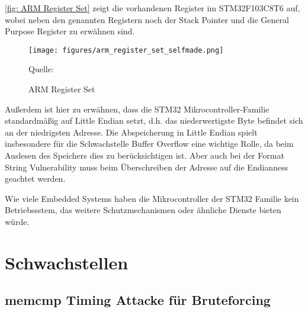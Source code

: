 \documentclass[a4paper,
DIV=13,
12pt,
BCOR=10mm,
department=FakIM,
oneside,
parskip=half,
automark,
listof=totocnumbered,
bibliography=totocnumbered,
acronym=totocnumbered
] {OTHRartcl}
\newcommand*{\quelle}[1]{\par\raggedleft\footnotesize Quelle:~#1}
\begin{document}
\autoref{fig: ARM Register Set} zeigt die vorhandenen Register im STM32F103C8T6 auf, wobei neben den genannten Registern noch der Stack Pointer und die General Purpose Register zu erwähnen sind. \cite{STM32F103Cx DataSheets}
\begin{figure}[ht!]
\begin{center}
  \texttt{[image: figures/arm\_register\_set\_selfmade.png]}
  \quelle{\cite{STM32F103Cx DataSheets}}
  \caption{ARM Register Set}
  \label{fig: ARM Register Set}
\end{center}
\end{figure}

Außerdem ist hier zu erwähnen, dass die STM32 Mikrocontroller-Familie standardmäßig auf Little Endian setzt, d.h. das niederwertigste Byte befindet sich an der niedrigsten Adresse. %
Die Abspeicherung in Little Endian spielt insbesondere für die Schwachstelle Buffer Overflow eine wichtige Rolle, da beim Auslesen des
Speichers dies zu berücksichtigen ist. Aber auch bei der Format String Vulnerability muss beim Überschreiben der Adresse auf die Endianness geachtet werden. \cite{STM32F103Cx DataSheets} \cite{STM32F10xxx/20xxx/21xxx/L1xxx3Cx8 DataSheets}

Wie viele Embedded Systems haben die Mikrocontroller der STM32 Familie kein Betriebssstem, das weitere Schutzmechanismen oder ähnliche Dienste bieten würde.

\section{Schwachstellen}
\label{sec:Schwachstellen}
\subsection{memcmp Timing Attacke für Bruteforcing}
\end{document}
